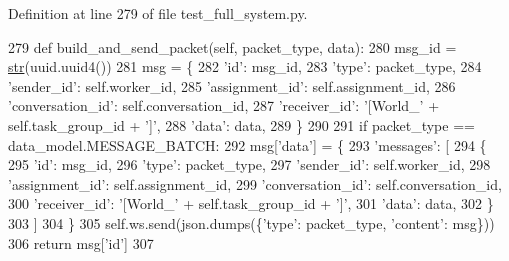 Definition at line 279 of file test\+\_\+full\+\_\+system.\+py.


\begin{DoxyCode}
279     \textcolor{keyword}{def }build\_and\_send\_packet(self, packet\_type, data):
280         msg\_id = \hyperlink{namespacegenerate__task__READMEs_a5b88452ffb87b78c8c85ececebafc09f}{str}(uuid.uuid4())
281         msg = \{
282             \textcolor{stringliteral}{'id'}: msg\_id,
283             \textcolor{stringliteral}{'type'}: packet\_type,
284             \textcolor{stringliteral}{'sender\_id'}: self.worker\_id,
285             \textcolor{stringliteral}{'assignment\_id'}: self.assignment\_id,
286             \textcolor{stringliteral}{'conversation\_id'}: self.conversation\_id,
287             \textcolor{stringliteral}{'receiver\_id'}: \textcolor{stringliteral}{'[World\_'} + self.task\_group\_id + \textcolor{stringliteral}{']'},
288             \textcolor{stringliteral}{'data'}: data,
289         \}
290 
291         \textcolor{keywordflow}{if} packet\_type == data\_model.MESSAGE\_BATCH:
292             msg[\textcolor{stringliteral}{'data'}] = \{
293                 \textcolor{stringliteral}{'messages'}: [
294                     \{
295                         \textcolor{stringliteral}{'id'}: msg\_id,
296                         \textcolor{stringliteral}{'type'}: packet\_type,
297                         \textcolor{stringliteral}{'sender\_id'}: self.worker\_id,
298                         \textcolor{stringliteral}{'assignment\_id'}: self.assignment\_id,
299                         \textcolor{stringliteral}{'conversation\_id'}: self.conversation\_id,
300                         \textcolor{stringliteral}{'receiver\_id'}: \textcolor{stringliteral}{'[World\_'} + self.task\_group\_id + \textcolor{stringliteral}{']'},
301                         \textcolor{stringliteral}{'data'}: data,
302                     \}
303                 ]
304             \}
305         self.ws.send(json.dumps(\{\textcolor{stringliteral}{'type'}: packet\_type, \textcolor{stringliteral}{'content'}: msg\}))
306         \textcolor{keywordflow}{return} msg[\textcolor{stringliteral}{'id'}]
307 
\end{DoxyCode}
\mbox{\label{classparlai_1_1mturk_1_1core_1_1dev_1_1test_1_1test__full__system_1_1MockAgent_a9fb654ef5b3775a6991dc1dcafa16835}} 
